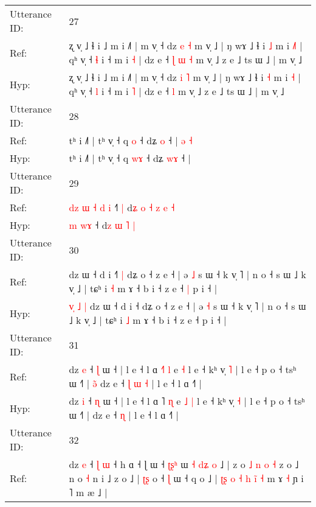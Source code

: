 \documentclass[10pt]{article}
\DeclareRobustCommand{\hl}[1]{{\textcolor{red}{#1}}}
\begin{document}
\begin{longtable}{ll}
 \\
\midrule
Utterance ID: & 27 \\
Ref: & ʐ v̩ ˩ ɬ i ˩ m i ˩˥ | m v̩ ˧ dz \hl{e} \hl{˧} m v̩ ˩ | ŋ wɤ ˩ ɬ i \hl{˩} m i \hl{˩}\hl{˥} | qʰ v̩ ˧ \hl{ɬ} i ˧ m i \hl{˧} | dz e ˧\hl{ }\hl{ɭ}\hl{ }\hl{ɯ} \hl{˧} m v̩ ˩ z e ˩ ts ɯ ˩ | m v̩ ˩
 \\
Hyp: & ʐ v̩ ˩ ɬ i ˩ m i ˩˥ | m v̩ ˧ dz \hl{i} \hl{˥} m v̩ ˩ | ŋ wɤ ˩ ɬ i \hl{˧} m i \hl{}\hl{˧} | qʰ v̩ ˧ \hl{l} i ˧ m i \hl{˥} | dz e ˧\hl{}\hl{}\hl{}\hl{} \hl{l} m v̩ ˩ z e ˩ ts ɯ ˩ | m v̩ ˩
 \\
\midrule
Utterance ID: & 28 \\
Ref: & tʰ i ˩˥ | tʰ v̩ ˧ q \hl{}\hl{o} ˧ dʑ \hl{}\hl{o} ˧ |\hl{ }\hl{ə}\hl{ }\hl{˧}
 \\
Hyp: & tʰ i ˩˥ | tʰ v̩ ˧ q \hl{w}\hl{ɤ} ˧ dʑ \hl{w}\hl{ɤ} ˧ |\hl{}\hl{}\hl{}\hl{}
 \\
\midrule
Utterance ID: & 29 \\
Ref: & \hl{d}\hl{z}\hl{ }\hl{ɯ}\hl{ }\hl{˧} \hl{d}\hl{ }\hl{i} ˧\hl{˥}\hl{ }\hl{|} d\hl{ʑ}\hl{ }\hl{o}\hl{ }\hl{˧} \hl{z} \hl{e} \hl{˧}
 \\
Hyp: & \hl{}\hl{}\hl{}\hl{}\hl{}\hl{m} \hl{}\hl{w}\hl{ɤ} ˧\hl{}\hl{}\hl{} d\hl{}\hl{}\hl{}\hl{}\hl{z} \hl{ɯ} \hl{˥} \hl{|}
 \\
\midrule
Utterance ID: & 30 \\
Ref: & \hl{}\hl{}\hl{}\hl{}\hl{}\hl{}\hl{}dz ɯ ˧ d i ˧\hl{˥}\hl{ }\hl{|} dʑ o ˧ z e ˧ | ə \hl{˩} s ɯ ˧ k v̩ ˥ | n o ˧ s ɯ ˩ k v̩ ˩ | tɕʰ i \hl{˧} m ɤ ˧ b i ˧ z e ˧\hl{ }\hl{|} p i ˧ |
 \\
Hyp: & \hl{v}\hl{̩}\hl{ }\hl{˩}\hl{ }\hl{|}\hl{ }dz ɯ ˧ d i ˧\hl{}\hl{}\hl{} dʑ o ˧ z e ˧ | ə \hl{˧} s ɯ ˧ k v̩ ˥ | n o ˧ s ɯ ˩ k v̩ ˩ | tɕʰ i \hl{˩} m ɤ ˧ b i ˧ z e ˧\hl{}\hl{} p i ˧ |
 \\
\midrule
Utterance ID: & 31 \\
Ref: & dz \hl{e} ˧ \hl{ɭ} ɯ ˧ | l e ˧ l ɑ \hl{˧}˥ \hl{l} e\hl{}\hl{} \hl{˧} l e ˧ kʰ v̩ \hl{˥} | l e ˧ p o ˧ tsʰ ɯ ˧˥ |\hl{ }\hl{ə}\hl{̃} dz e ˧\hl{ }\hl{ɭ}\hl{ }\hl{ɯ} \hl{˧} | l e ˧ l ɑ ˧˥ |
 \\
Hyp: & dz \hl{i} ˧ \hl{ɳ} ɯ ˧ | l e ˧ l ɑ \hl{}˥ \hl{ɳ} e\hl{ }\hl{˩} \hl{|} l e ˧ kʰ v̩ \hl{˧} | l e ˧ p o ˧ tsʰ ɯ ˧˥ |\hl{}\hl{}\hl{} dz e ˧\hl{}\hl{}\hl{}\hl{} \hl{ɳ} | l e ˧ l ɑ ˧˥ |
 \\
\midrule
Utterance ID: & 32 \\
Ref: & dz \hl{e} ˧ \hl{ɭ} \hl{}\hl{ɯ} ˧\hl{}\hl{} h ɑ ˧ ɭ ɯ ˧ \hl{ʈ}\hl{ʂ}\hl{ʰ} ɯ\hl{ }\hl{˧} \hl{d}\hl{ʑ}\hl{ }\hl{o} ˩ | z o\hl{}\hl{} \hl{˩} \hl{n} \hl{o} \hl{˧} z o ˩ n o \hl{˧} n i ˩ z o ˩ | \hl{ʈ}\hl{ʂ} o ˧ \hl{ɭ} ɯ ˧ q o ˩ |\hl{ }\hl{ʈ}\hl{ʂ}\hl{ }\hl{o}\hl{ }\hl{˧} \hl{h} \hl{i}\hl{̃} \hl{˧} m ɤ \hl{˧} ɲ i ˥ m æ ˩ |

\end{longtable}
\end{document}
